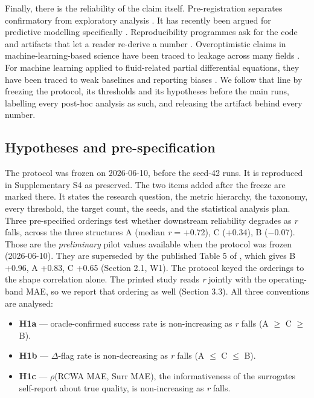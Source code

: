 \documentclass[11pt,a4paper]{article}
\providecommand{\tightlist}{\setlength{\itemsep}{0pt}\setlength{\parskip}{0pt}}
\begin{document}
Finally, there is the reliability of the claim itself. Pre-registration separates
confirmatory from exploratory analysis \cite{nosek201834}. It has recently been argued for predictive
modelling specifically \cite{al202335}. Reproducibility programmes ask for the code and artifacts
that let a reader re-derive a number \cite{al202136}. Overoptimistic claims in machine-learning-based
science have been traced to leakage across many fields \cite{kapoor202337}. For machine learning applied
to fluid-related partial differential equations, they have been traced to weak baselines
and reporting biases \cite{mcgreivy202438}. We follow that line by freezing the protocol, its thresholds
and its hypotheses before the main runs, labelling every post-hoc analysis as such, and
releasing the artifact behind every number.

\subsection{Hypotheses and pre-specification}\label{sec:1.4}

The protocol was frozen on 2026-06-10, before the seed-42 runs. It is reproduced in
Supplementary S4 as preserved. The two items added after the freeze are marked there. It
states the research question, the metric hierarchy, the taxonomy, every threshold, the
target count, the seeds, and the statistical analysis plan. Three pre-specified orderings
test whether downstream reliability degrades as \emph{r} falls, across the three structures A
(median \emph{r} = +0.72), C (+0.34), B (\ensuremath{-}0.07). Those are the \emph{preliminary} pilot values
available when the protocol was frozen (2026-06-10). They are superseded by the published
Table 5 of \cite{choi20261}, which gives B +0.96, A +0.83, C +0.65 (Section 2.1, W1). The protocol
keyed the orderings to the shape correlation alone. The printed study reads \emph{r} jointly
with the operating-band MAE, so we report that ordering as well
(Section 3.3). All three conventions are analysed:

\begin{itemize}
\tightlist
\item
  \textbf{H1a} --- oracle-confirmed success rate is non-increasing as \emph{r} falls (A \ensuremath{\geq} C \ensuremath{\geq} B).
\item
  \textbf{H1b} --- \ensuremath{\Delta}-flag rate is non-decreasing as \emph{r} falls (A \ensuremath{\leq} C \ensuremath{\leq} B).
\item
  \textbf{H1c} --- \ensuremath{\rho}(RCWA MAE, Surr MAE), the informativeness of the surrogate\textquotesingle s
  self-report about true quality, is non-increasing as \emph{r} falls.
\end{itemize}
\end{document}

